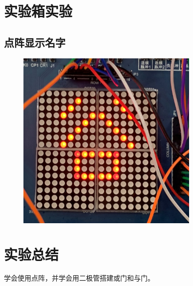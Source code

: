 \documentclass[UTF8, a4paper, 11pt]{article}
\begin{document}
\section{实验箱实验}
\subsection{点阵显示名字}
\begin{figure}[H]
    \centering
    \includegraphics[width=0.8\textwidth]{谷.JPG}
\end{figure}
\section{实验总结}
学会使用点阵，并学会用二极管搭建或门和与门。
%
%
\end{document}
